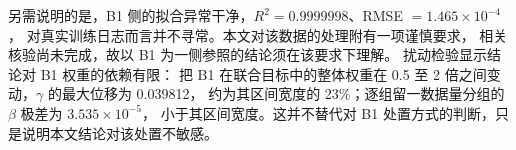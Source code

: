 另需说明的是，B1 侧的拟合异常干净，$R^2=0.9999998$、RMSE $=1.465\times10^{-4}$，
对真实训练日志而言并不寻常。本文对该数据的处理附有一项谨慎要求，
相关核验尚未完成，故以 B1 为一侧参照的结论须在该要求下理解。
扰动检验显示结论对 B1 权重的依赖有限：
把 B1 在联合目标中的整体权重在 0.5 至 2 倍之间变动，$\gamma$ 的最大位移为 0.039812，
约为其区间宽度的 23\%；逐组留一数据量分组的 $\beta$ 极差为 $3.535\times10^{-5}$，
小于其区间宽度。这并不替代对 B1 处置方式的判断，只是说明本文结论对该处置不敏感。
